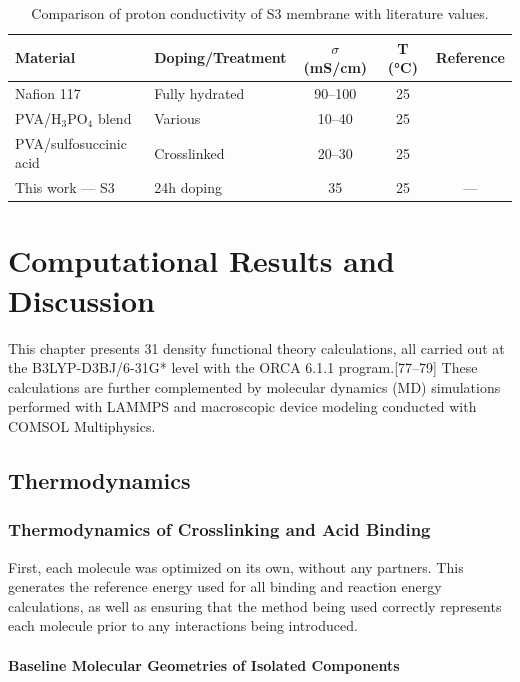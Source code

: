 \documentclass[12pt,a4paper]{report}
\begin{document}
\begin{table}[h!]
\centering
\caption{Comparison of proton conductivity of S3 membrane with literature values.}
\label{tab:conductivity-comparison}
\begin{tabular}{l l c c c}
\hline
Material & Doping/Treatment & \(\sigma\) (mS/cm) & T (°C) & Reference \\
\hline
Nafion 117 & Fully hydrated & 90–100 & 25 & \cite{5,6} \\
PVA/H\(_3\)PO\(_4\) blend & Various & 10–40 & 25 & \cite{57,58} \\
PVA/sulfosuccinic acid & Crosslinked & 20–30 & 25 & \cite{113} \\
This work — S3 & 24h doping & 35 & 25 & — \\
\hline
\end{tabular}
\end{table}

\chapter{Computational Results and Discussion}

This chapter presents 31 density functional theory calculations, all carried out at the B3LYP-D3BJ/6-31G* level with the ORCA 6.1.1 program.[77–79] These calculations are further complemented by molecular dynamics (MD) simulations performed with LAMMPS and macroscopic device modeling conducted with COMSOL Multiphysics. 
\section{Thermodynamics}
\subsection{Thermodynamics of Crosslinking and Acid Binding}
First, each molecule was optimized on its own, without any partners. This generates the reference energy used for all binding and reaction energy calculations, as well as ensuring that the method being used correctly represents each molecule prior to any interactions being introduced.

\subsubsection{Baseline Molecular Geometries of Isolated Components}
\end{document}
